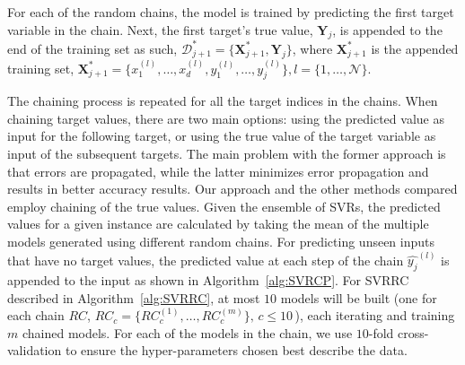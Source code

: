 \documentclass[preprint,12pt]{elsarticle}
\begin{document}
For each of the random chains, the model is trained by predicting the first target variable in the chain. Next, the first target's true value, $\bm Y_j$, is appended to the end of the training set as such, $\mathcal{D}_{j+1}^* = \{\bm X_{j+1}^*, \bm Y_j\}$, where $\bm X_{j+1}^*$ is the appended training set, ${\bm X_{j+1}^* = \{x_1^{(l)},\ldots,x_d^{(l)},y_1^{(l)},\ldots,y_j^{(l)}\},l=\{1,\ldots,\mathcal N\}}$. 

The chaining process is repeated for all the target indices in the chains. When chaining target values, there are two main options: using the predicted value as input for the following target, or using the true value of the target variable as input of the subsequent targets. The main problem with the former approach is that errors are propagated, while the latter minimizes error propagation and results in better accuracy results. Our approach and the other methods compared employ chaining of the true values. Given the ensemble of SVRs, the predicted values for a given instance are calculated by taking the mean of the multiple models generated using different random chains. For predicting unseen inputs that have no target values, the predicted value at each step of the chain $\hat{y_j}^{(l)}$ is appended to the input as shown in Algorithm~\ref{alg:SVRCP}. For SVRRC described in Algorithm~\ref{alg:SVRRC}, at most $10$ models will be built (one for each chain $RC$, $RC_c = \{RC_c^{(1)}, \ldots, RC_c^{(m)}\}, \, c \leq 10 \,$), each iterating and training $m$ chained models. For each of the models in the chain, we use $10$-fold cross-validation to ensure the hyper-parameters chosen best describe the data. 
\end{document}
